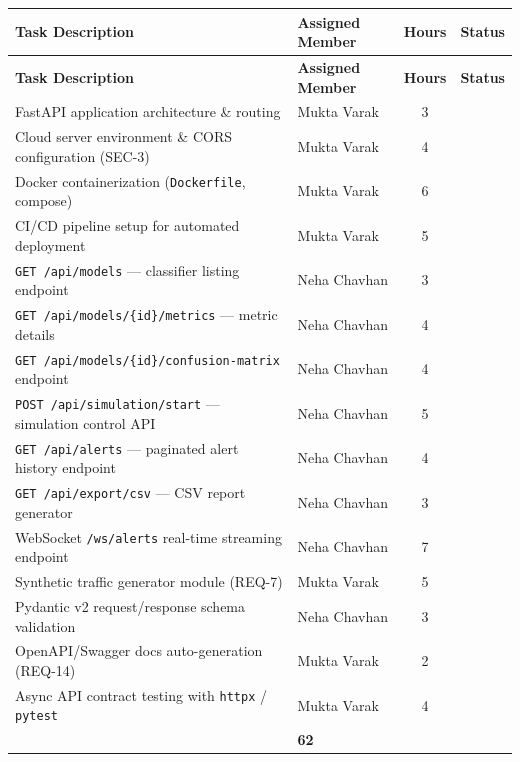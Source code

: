\documentclass[11pt, a4paper]{article}
\newcommand{\xmark}{\textcolor{danger}{\ding{55}}}
\begin{document}
\noindent
\small
\begin{longtable}{|p{}|p{}|c|c|}
\hline
\rowcolor{primary!10}
\textbf{Task Description} & \textbf{Assigned Member} & \textbf{Hours} & \textbf{Status} \\
\hline
\endfirsthead
\hline
\rowcolor{primary!10}
\textbf{Task Description} & \textbf{Assigned Member} & \textbf{Hours} & \textbf{Status} \\
\hline
\endhead
FastAPI application architecture \& routing & Mukta Varak & 3 & \xmark \\
Cloud server environment \& CORS configuration (SEC-3) & Mukta Varak & 4 & \xmark \\
Docker containerization (\texttt{Dockerfile}, compose) & Mukta Varak & 6 & \xmark \\
CI/CD pipeline setup for automated deployment & Mukta Varak & 5 & \xmark \\
\texttt{GET /api/models} — classifier listing endpoint & Neha Chavhan & 3 & \xmark \\
\texttt{GET /api/models/\{id\}/metrics} — metric details & Neha Chavhan & 4 & \xmark \\
\texttt{GET /api/models/\{id\}/confusion-matrix} endpoint & Neha Chavhan & 4 & \xmark \\
\texttt{POST /api/simulation/start} — simulation control API & Neha Chavhan & 5 & \xmark \\
\texttt{GET /api/alerts} — paginated alert history endpoint & Neha Chavhan & 4 & \xmark \\
\texttt{GET /api/export/csv} — CSV report generator & Neha Chavhan & 3 & \xmark \\
WebSocket \texttt{/ws/alerts} real-time streaming endpoint & Neha Chavhan & 7 & \xmark \\
Synthetic traffic generator module (REQ-7) & Mukta Varak & 5 & \xmark \\
Pydantic v2 request/response schema validation & Neha Chavhan & 3 & \xmark \\
OpenAPI/Swagger docs auto-generation (REQ-14) & Mukta Varak & 2 & \xmark \\
Async API contract testing with \texttt{httpx} / \texttt{pytest} & Mukta Varak & 4 & \xmark \\
\hline
\rowcolor{lightgray}
\multicolumn{2}{|r|}{\textbf{Phase 2 Total}} & \textbf{62} & \\
\hline
\end{longtable}
\normalsize
\end{document}
